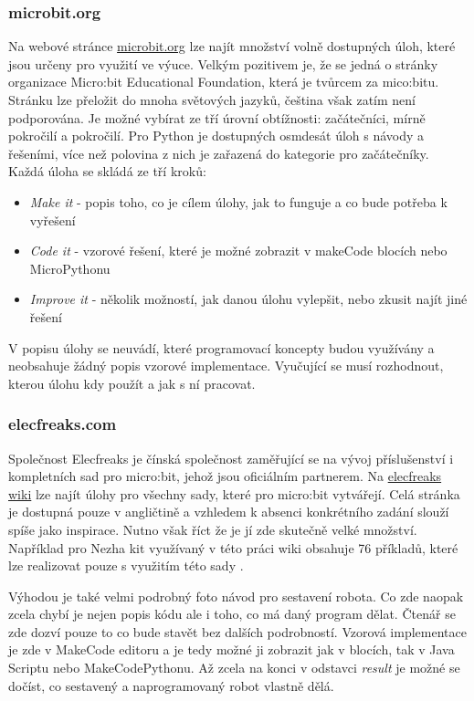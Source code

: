 \documentclass[
  digital,     %
  oneside,     %
  nosansbold,  %
  colorbold, %
  lof,         %
  nolot,         %
]{fithesis4}
\begin{document}
\subsubsection{microbit.org}
Na webové stránce \href{https://microbit.org/teach/classroom-resources/}{microbit.org} lze najít množství volně dostupných úloh, které jsou určeny pro využití ve výuce. Velkým pozitivem je, že se jedná o stránky organizace Micro:bit Educational Foundation, která je tvůrcem za mico:bitu. Stránku lze přeložit do mnoha světových jazyků, čeština však zatím není podporována. Je možné vybírat ze tří úrovní obtížnosti: začátečníci, mírně pokročilí a pokročilí. Pro Python je dostupných osmdesát úloh s návody a řešeními, více než polovina z nich je zařazená do kategorie pro začátečníky. Každá úloha se skládá ze tří kroků:
\begin{itemize}
    \item \textit{Make it} - popis toho, co je cílem úlohy, jak to funguje a co bude potřeba k vyřešení
    \item \textit{Code it} - vzorové řešení, které je možné zobrazit v makeCode blocích nebo MicroPythonu
    \item \textit{Improve it} - několik možností, jak danou úlohu vylepšit, nebo zkusit najít jiné řešení
\end{itemize}
V popisu úlohy se neuvádí, které programovací koncepty budou využívány a neobsahuje žádný popis vzorové implementace. Vyučující se musí rozhodnout, kterou úlohu kdy použít a jak s ní pracovat.

\subsubsection{elecfreaks.com}
Společnost Elecfreaks je čínská společnost zaměřující se na vývoj příslušenství i kompletních sad pro micro:bit, jehož jsou oficiálním partnerem\cite{elecfreaks}. Na \href{https://www.elecfreaks.com/learn-en/index.html}{elecfreaks wiki} lze najít úlohy pro všechny sady, které pro micro:bit vytvářejí. Celá stránka je dostupná pouze v angličtině a vzhledem k absenci konkrétního zadání slouží spíše jako inspirace. Nutno však říct že je jí zde skutečně velké množství. Například pro Nezha kit využívaný v této práci wiki obsahuje 76 příkladů, které lze realizovat pouze s využitím této sady \cite{nezhaelecfreaks}. 

Výhodou je také velmi podrobný foto návod pro sestavení robota. Co zde naopak zcela chybí je nejen popis kódu ale i toho, co má daný program dělat. Čtenář se zde dozví pouze to co bude stavět bez dalších podrobností. Vzorová implementace je zde v MakeCode editoru a je tedy možné ji zobrazit jak v blocích, tak v Java Scriptu nebo MakeCodePythonu. Až zcela na konci v odstavci \textit{result} je možné se dočíst, co sestavený a naprogramovaný robot vlastně dělá.
\end{document}
